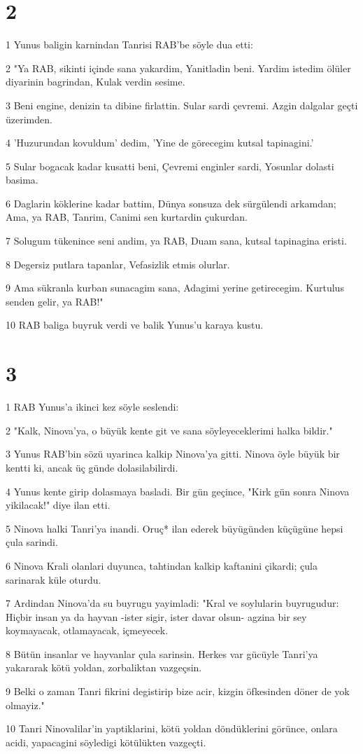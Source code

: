 \chapter{2}

\par 1 Yunus baligin karnindan Tanrisi RAB'be söyle dua etti:
\par 2 "Ya RAB, sikinti içinde sana yakardim, Yanitladin beni. Yardim istedim ölüler diyarinin bagrindan, Kulak verdin sesime.
\par 3 Beni engine, denizin ta dibine firlattin. Sular sardi çevremi. Azgin dalgalar geçti üzerimden.
\par 4 'Huzurundan kovuldum' dedim, 'Yine de görecegim kutsal tapinagini.'
\par 5 Sular bogacak kadar kusatti beni, Çevremi enginler sardi, Yosunlar dolasti basima.
\par 6 Daglarin köklerine kadar battim, Dünya sonsuza dek sürgülendi arkamdan; Ama, ya RAB, Tanrim, Canimi sen kurtardin çukurdan.
\par 7 Solugum tükenince seni andim, ya RAB, Duam sana, kutsal tapinagina eristi.
\par 8 Degersiz putlara tapanlar, Vefasizlik etmis olurlar.
\par 9 Ama sükranla kurban sunacagim sana, Adagimi yerine getirecegim. Kurtulus senden gelir, ya RAB!"
\par 10 RAB baliga buyruk verdi ve balik Yunus'u karaya kustu.

\chapter{3}

\par 1 RAB Yunus'a ikinci kez söyle seslendi:
\par 2 "Kalk, Ninova'ya, o büyük kente git ve sana söyleyeceklerimi halka bildir."
\par 3 Yunus RAB'bin sözü uyarinca kalkip Ninova'ya gitti. Ninova öyle büyük bir kentti ki, ancak üç günde dolasilabilirdi.
\par 4 Yunus kente girip dolasmaya basladi. Bir gün geçince, "Kirk gün sonra Ninova yikilacak!" diye ilan etti.
\par 5 Ninova halki Tanri'ya inandi. Oruç* ilan ederek büyügünden küçügüne hepsi çula sarindi.
\par 6 Ninova Krali olanlari duyunca, tahtindan kalkip kaftanini çikardi; çula sarinarak küle oturdu.
\par 7 Ardindan Ninova'da su buyrugu yayimladi: "Kral ve soylularin buyrugudur: Hiçbir insan ya da hayvan -ister sigir, ister davar olsun- agzina bir sey koymayacak, otlamayacak, içmeyecek.
\par 8 Bütün insanlar ve hayvanlar çula sarinsin. Herkes var gücüyle Tanri'ya yakararak kötü yoldan, zorbaliktan vazgeçsin.
\par 9 Belki o zaman Tanri fikrini degistirip bize acir, kizgin öfkesinden döner de yok olmayiz."
\par 10 Tanri Ninovalilar'in yaptiklarini, kötü yoldan döndüklerini görünce, onlara acidi, yapacagini söyledigi kötülükten vazgeçti.

